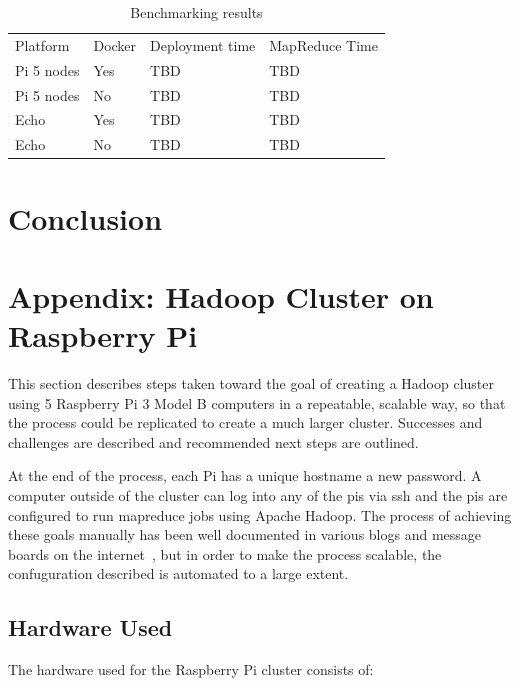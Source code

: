 \begin{table}[hbt]
\centering
\caption{Benchmarking results}\label{t:results-table}
\begin{tabular}{llll}
Platform    & Docker & Deployment time & MapReduce Time \\
Pi 5 nodes  & Yes    & TBD             & TBD            \\
Pi 5 nodes  & No     & TBD             & TBD            \\
Echo        & Yes    & TBD             & TBD            \\
Echo        & No     & TBD             & TBD            \\
\end{tabular}
\end{table}



\section{Conclusion}\label{s:conclusion}


\section{Appendix: Hadoop Cluster on Raspberry Pi}\label{s:appendix}
This section describes steps taken toward the goal of creating a
Hadoop cluster using 5 Raspberry Pi 3 Model B computers in a
repeatable, scalable way, so that the process could be replicated to
create a much larger cluster. Successes and challenges are described
and recommended next steps are outlined.

At the end of the process, each Pi has a unique hostname a new
password. A computer outside of the cluster can log into any of the
pis via ssh and the pis are configured to run mapreduce jobs using
Apache Hadoop. The process of achieving these goals manually has been
well documented in various blogs and message boards on the
internet~\cite{hid-sp18-419-headless}, but in order to make the
process scalable, the confuguration described is automated to a large
extent.

\subsection{Hardware Used}

The hardware used for the Raspberry Pi cluster consists of:

